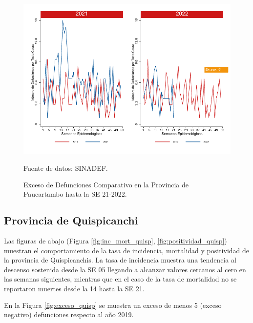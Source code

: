 \documentclass[12pt,a4paper,openany]{book}
\begin{document}
	\begin{figure}[h]
		\caption{Exceso de Defunciones Comparativo en la Provincia de Paucartambo hasta la SE 21-2022.}\label{fig:exceso_paucartam}
		\begin{center}
			\includegraphics[width=0.7\linewidth]{../figuras/exceso_11.pdf}
		\end{center}
		{\footnotesize {Fuente de datos: SINADEF.}}
	\end{figure}
	
	\clearpage
	
	\subsection*{Provincia de Quispicanchi}
	\noindent Las figuras de abajo (Figura \ref{fig:inc_mort_quisp}, \ref{fig:positividad_quisp}) muestran el comportamiento de la tasa de incidencia, mortalidad y positividad de la provincia de Quispicanchis. La tasa de incidencia muestra una tendencia al descenso sostenida desde la SE 05 llegando a alcanzar valores cercanos al cero en las semanas siguientes, mientras que en el caso de la tasa de mortalidad no se reportaron muertes desde la  14 hasta la SE 21.
	
	En la Figura \ref{fig:exceso_quisp} se muestra un exceso de menos 5 (exceso negativo) defunciones respecto al año 2019.
	
\end{document}
